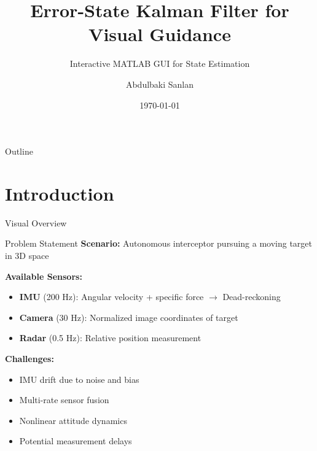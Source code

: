 \documentclass{beamer}
\title[ESKF Visual Guidance]{Error-State Kalman Filter for Visual Guidance}
\subtitle{Interactive MATLAB GUI for State Estimation}
\author{Abdulbaki Sanlan}
\institute{}
\date{\today}
\begin{document}
\begin{frame}
\titlepage
\end{frame}

\begin{frame}{Outline}
\tableofcontents
\end{frame}

\section{Introduction}

\begin{frame}{Visual Overview}
\begin{center}
\end{center}
\end{frame}

\begin{frame}{Problem Statement}
\textbf{Scenario:} Autonomous interceptor pursuing a moving target in 3D space

\vspace{0.5cm}
\textbf{Available Sensors:}
\begin{itemize}
    \item \textbf{IMU} (200 Hz): Angular velocity + specific force $\rightarrow$ Dead-reckoning
    \item \textbf{Camera} (30 Hz): Normalized image coordinates of target
    \item \textbf{Radar} (0.5 Hz): Relative position measurement
\end{itemize}

\vspace{0.5cm}
\textbf{Challenges:}
\begin{itemize}
    \item IMU drift due to noise and bias
    \item Multi-rate sensor fusion
    \item Nonlinear attitude dynamics
    \item Potential measurement delays
\end{itemize}
\end{frame}
\end{document}
